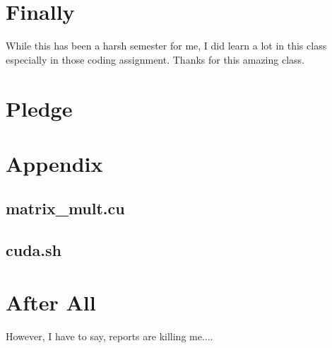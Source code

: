 \documentclass{cs4444}
\begin{document}
\section{Finally}
While this has been a harsh semester for me, I did learn a lot in this class especially in those coding assignment. Thanks for this amazing class.
  
\section{Pledge}

\pledge
\newpage
\section{Appendix}
\subsection{matrix\_mult.cu}

\subsection{cuda.sh}

\section{After All}
However, I have to say, reports are killing me.... 
\end{document}
